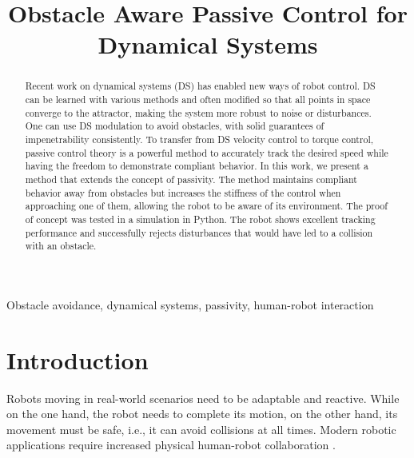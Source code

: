 \documentclass[conference]{IEEEtran}
\begin{document}
\newcommand{\vect}[1]{\boldsymbol{#1}}
\newcommand{\vecs}[1]{\boldsymbol{#1}}
\newcommand{\matr}[1]{\boldsymbol{#1}}
\newcommand{\matd}[1]{\mathcal{#1}}

\newcommand{\dotprod}[2]{\left\langle {#1}, \, {#2} \right\rangle}
\newcommand{\normdotprod}[2]{\frac{\left\langle #1, \, #2 \right\rangle}{\| #1 \| \, \| #2 \|}}

\newtheorem{theorem}{Theorem}[section]
\newtheorem{corollary}{Corollary}[section]
\newtheorem{lemma}{Lemma}[section]
\theoremstyle{definition}
\newtheorem{definition}{Definition}[section]


\title{Obstacle Aware Passive Control for Dynamical Systems}
\author{
}

\maketitle
\thispagestyle{plain}
\pagestyle{plain}

\begin{abstract}
Recent work on dynamical systems (DS) has enabled new ways of robot control. DS can be learned with various methods and often modified so that all points in space converge to the attractor, making the system more robust to noise or disturbances.
One can use DS modulation to avoid obstacles, with solid guarantees of impenetrability consistently. To transfer from DS velocity control to torque control, passive control theory is a powerful method to accurately track the desired speed while having the freedom to demonstrate compliant behavior.
In this work, we present a method that extends the concept of passivity.
The method maintains compliant behavior away from obstacles but increases the stiffness of the control when approaching one of them, allowing the robot to be aware of its environment.
The proof of concept was tested in a simulation in Python. The robot shows excellent tracking performance and successfully rejects disturbances that would have led to a collision with an obstacle. 
\end{abstract}

\begin{IEEEkeywords}
Obstacle avoidance, dynamical systems, passivity, human-robot interaction
\end{IEEEkeywords}


\section{Introduction}
Robots moving in real-world scenarios need to be adaptable and reactive.
While on the one hand, the robot needs to complete its motion, on the other hand, its movement must be safe, i.e., it can avoid collisions at all times.
Modern robotic applications require increased physical human-robot collaboration \cite{ajoudani2018progress}.
\end{document}
